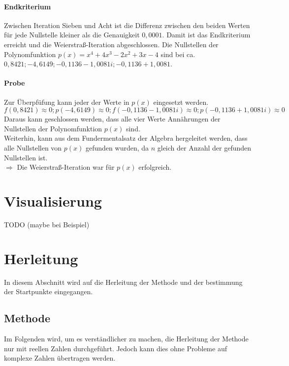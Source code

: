 \documentclass[12pt]{article}
\begin{document}
\paragraph{Endkriterium}
Zwischen Iteration Sieben und Acht ist die Differenz zwischen den beiden Werten für jede Nullstelle kleiner als die Genauigkeit $0,0001$. Damit ist das Endkriterium erreicht und die Weierstraß-Iteration abgeschlossen. 
Die Nullstellen der Polynomfunktion $p(x) = x^4 + 4x^3 - 2x^2 + 3x - 4$ sind bei ca. $0,8421; -4,6149; -0,1136 - 1,0081i; -0,1136 + 1,0081$. 
\paragraph{Probe}
Zur Überpfüfung kann jeder der Werte in $p(x)$ eingesetzt werden.
\begin{displaymath}
    f(0,8421) \approx 0; p(-4,6149) \approx 0; f(-0,1136 - 1,0081i) \approx 0; p(-0,1136 + 1,0081i) \approx 0
\end{displaymath}
Daraus kann geschlossen werden, dass alle vier Werte Annährungen der Nullstellen der Polynomfunktion $p(x)$ sind. \\
Weiterhin, kann aus dem Fundermentalsatz der Algebra hergeleitet werden, dass alle Nullstellen von $p(x)$ gefunden wurden, da $n$ gleich der Anzahl der gefunden Nullstellen ist. \\
$\Rightarrow$ Die Weierstraß-Iteration war für $p(x)$ erfolgreich.

\section{Visualisierung}
TODO (maybe bei Beispiel)


\section{Herleitung}
In diesem Abschnitt wird auf die Herleitung der Methode und der bestimmung der Startpunkte eingegangen.
\subsection{Methode}
Im Folgenden wird, um es verständlicher zu machen, die Herleitung der Methode nur mit reellen Zahlen durchgeführt. Jedoch kann dies ohne Probleme auf komplexe Zahlen übertragen werden.
\end{document}

